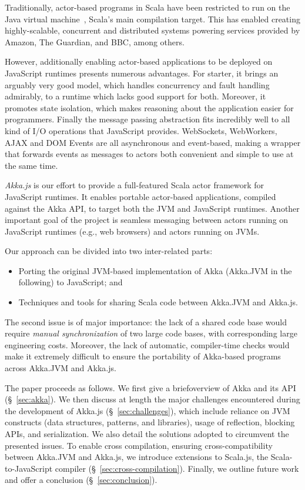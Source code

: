 \documentclass{sig-alternate}
\begin{document}
Traditionally, actor-based programs in Scala have been restricted to run on the Java virtual machine~\cite{Lindholm-Yellin}, Scala's main compilation target. This has enabled creating highly-scalable, concurrent and distributed systems powering services provided by Amazon, The Guardian, and BBC, among others.

However, additionally enabling actor-based applications to be deployed on JavaScript runtimes presents numerous advantages. For starter, it brings an arguably very good model, which handles concurrency and fault handling admirably, to a runtime which lacks good support for both. Moreover, it promotes state isolation, which makes reasoning about the application easier for programmers. Finally the message passing abstraction fits incredibly well to all kind of I/O operations that JavaScript provides. WebSockets, WebWorkers, AJAX and DOM Events are all asynchronous and event-based, making a wrapper that forwards events as messages to actors both convenient and simple to use at the same time.

{\em Akka.js} is our effort to provide a full-featured Scala actor framework for JavaScript runtimes. It enables portable actor-based applications,
compiled against the Akka API, to target both the JVM and JavaScript runtimes. Another important goal of the project is seamless
messaging between actors running on JavaScript runtimes (e.g., web browsers) and actors running on JVMs.

Our approach can be divided into two inter-related parts:
\begin{itemize}
\item Porting the original JVM-based implementation of Akka (Akka.JVM in the following) to JavaScript; and
\item Techniques and tools for sharing Scala code between Akka.JVM and Akka.js.
\end{itemize}
\noindent
The second issue is of major importance: the lack of a shared code base would require {\em manual synchronization} of two large code bases, with
corresponding large engineering costs. Moreover, the lack of automatic, compiler-time checks would make it extremely difficult to ensure the
portability of Akka-based programs across Akka.JVM and Akka.js.

The paper proceeds as follows. We first give a brief\newline overview of Akka and its API (\S~\ref{sec:akka}). We then discuss at length the major challenges encountered during the development of Akka.js (\S~\ref{sec:challenges}), which include reliance on JVM constructs (data structures, patterns, and libraries), usage of reflection, blocking APIs, and serialization. We also detail the solutions adopted to circumvent the presented issues. To enable cross compilation, ensuring cross-compatibility between Akka.JVM and Akka.js, we introduce extensions to Scala.js, the Scala-to-JavaScript compiler (\S~\ref{sec:cross-compilation}). Finally, we outline future work and offer a conclusion (\S~\ref{sec:conclusion}).
\end{document}
